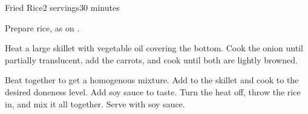 \documentclass[../Cookbook.tex]{subfiles}
\begin{document}
\begin{recipe}{Fried Rice}{2 servings}{30 minutes}

Prepare rice, as on .

Heat a large skillet with vegetable oil covering the bottom. Cook the onion until partially translucent, add the carrots, and cook until both are lightly browned.

Beat together to get a homogenous mixture. Add to the skillet and cook to the desired doneness level. Add soy sauce to taste. Turn the heat off, throw the rice in, and mix it all together. Serve with soy sauce.

\end{recipe}
\end{document}
